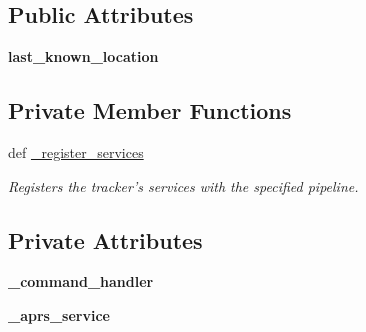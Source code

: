 \subsection*{Public Attributes}
\begin{DoxyCompactItemize}
\item 
\hypertarget{classhwm_1_1hardware_1_1devices_1_1drivers_1_1mxl__balloon__tracker_1_1mxl__balloon__tracker_1_1_m_x_l___balloon___tracker_aa6f2e1b3897fe2e1df456bcf6ba8434b}{{\bfseries last\-\_\-known\-\_\-location}}\label{classhwm_1_1hardware_1_1devices_1_1drivers_1_1mxl__balloon__tracker_1_1mxl__balloon__tracker_1_1_m_x_l___balloon___tracker_aa6f2e1b3897fe2e1df456bcf6ba8434b}

\end{DoxyCompactItemize}
\subsection*{Private Member Functions}
\begin{DoxyCompactItemize}
\item 
def \hyperlink{classhwm_1_1hardware_1_1devices_1_1drivers_1_1mxl__balloon__tracker_1_1mxl__balloon__tracker_1_1_m_x_l___balloon___tracker_a52773035396c7d2c6ec1b0712be44cf2}{\-\_\-register\-\_\-services}
\begin{DoxyCompactList}\small\item\em Registers the tracker's services with the specified pipeline. \end{DoxyCompactList}\end{DoxyCompactItemize}
\subsection*{Private Attributes}
\begin{DoxyCompactItemize}
\item 
\hypertarget{classhwm_1_1hardware_1_1devices_1_1drivers_1_1mxl__balloon__tracker_1_1mxl__balloon__tracker_1_1_m_x_l___balloon___tracker_ad2989b88005a09550b42a41767a182ee}{{\bfseries \-\_\-command\-\_\-handler}}\label{classhwm_1_1hardware_1_1devices_1_1drivers_1_1mxl__balloon__tracker_1_1mxl__balloon__tracker_1_1_m_x_l___balloon___tracker_ad2989b88005a09550b42a41767a182ee}

\item 
\hypertarget{classhwm_1_1hardware_1_1devices_1_1drivers_1_1mxl__balloon__tracker_1_1mxl__balloon__tracker_1_1_m_x_l___balloon___tracker_ae07a2ea07464fd3318f54a46ce19b545}{{\bfseries \-\_\-aprs\-\_\-service}}\label{classhwm_1_1hardware_1_1devices_1_1drivers_1_1mxl__balloon__tracker_1_1mxl__balloon__tracker_1_1_m_x_l___balloon___tracker_ae07a2ea07464fd3318f54a46ce19b545}

\end{DoxyCompactItemize}


